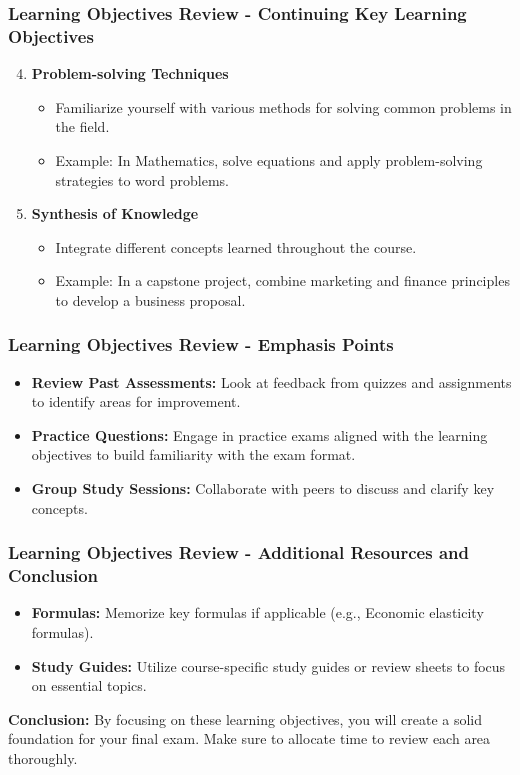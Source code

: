 \documentclass{beamer}
\begin{document}
\begin{frame}[fragile]
    \frametitle{Learning Objectives Review - Continuing Key Learning Objectives}
    \begin{enumerate}
        \setcounter{enumi}{3} %
        \item \textbf{Problem-solving Techniques}
        \begin{itemize}
            \item Familiarize yourself with various methods for solving common problems in the field.
            \item Example: In Mathematics, solve equations and apply problem-solving strategies to word problems.
        \end{itemize}

        \item \textbf{Synthesis of Knowledge}
        \begin{itemize}
            \item Integrate different concepts learned throughout the course.
            \item Example: In a capstone project, combine marketing and finance principles to develop a business proposal.
        \end{itemize}
    \end{enumerate}
\end{frame}

\begin{frame}[fragile]
    \frametitle{Learning Objectives Review - Emphasis Points}
    \begin{itemize}
        \item \textbf{Review Past Assessments:} Look at feedback from quizzes and assignments to identify areas for improvement.
        \item \textbf{Practice Questions:} Engage in practice exams aligned with the learning objectives to build familiarity with the exam format.
        \item \textbf{Group Study Sessions:} Collaborate with peers to discuss and clarify key concepts.
    \end{itemize}
\end{frame}

\begin{frame}[fragile]
    \frametitle{Learning Objectives Review - Additional Resources and Conclusion}
    \begin{itemize}
        \item \textbf{Formulas:} Memorize key formulas if applicable (e.g., Economic elasticity formulas).
        \item \textbf{Study Guides:} Utilize course-specific study guides or review sheets to focus on essential topics.
    \end{itemize}
    
    \textbf{Conclusion:} By focusing on these learning objectives, you will create a solid foundation for your final exam. Make sure to allocate time to review each area thoroughly.
\end{frame}
\end{document}

